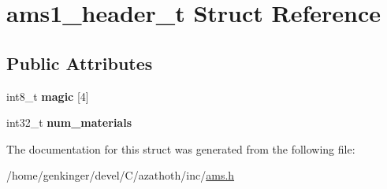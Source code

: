 \hypertarget{structams1__header__t}{}\section{ams1\+\_\+header\+\_\+t Struct Reference}
\label{structams1__header__t}
\subsection*{Public Attributes}
\begin{DoxyCompactItemize}
\item 
\mbox{\label{structams1__header__t_aa60dad33d9ecc51669e5c9797bfc31db}} 
int8\+\_\+t {\bfseries magic} \mbox{[}4\mbox{]}
\item 
\mbox{\label{structams1__header__t_aed57d428959139057b796455ead1716b}} 
int32\+\_\+t {\bfseries num\+\_\+materials}
\end{DoxyCompactItemize}


The documentation for this struct was generated from the following file\+:\begin{DoxyCompactItemize}
\item 
/home/genkinger/devel/\+C/azathoth/inc/\mbox{\hyperlink{ams_8h}{ams.\+h}}\end{DoxyCompactItemize}
